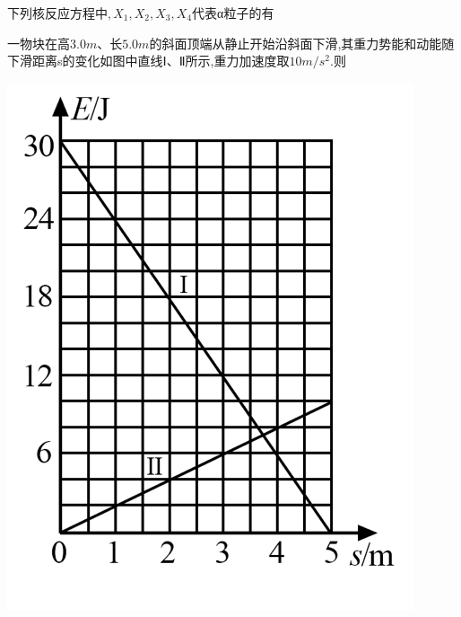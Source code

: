 \begin{solution}{4cm}

\end{solution}



\question[6]下列核反应方程中$,X_1,X_2,X_3,X_4$代表α粒子的有
\begin{solution}{4cm}

\end{solution}



\question[6]一物块在高$3.0m、$长$5.0m$的斜面顶端从静止开始沿斜面下滑,其重力势能和动能随下滑距离s的变化如图中直线$Ⅰ、Ⅱ$所示,重力加速度取$10m/s^2.$则
\begin{center}
\includegraphics[]{img/image4.png}
\end{center}

\begin{solution}{4cm}

\end{solution}




